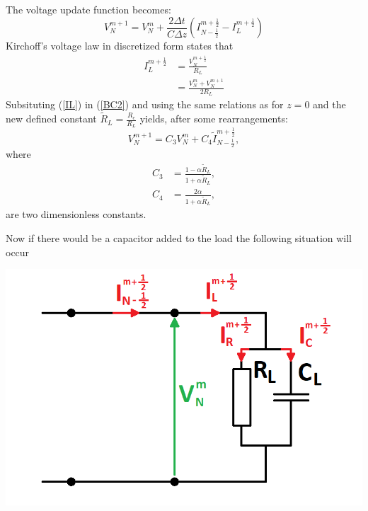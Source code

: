 \documentclass[dutch, a4paper, 11pt]{article}
\begin{document}
\begin{multicols}{2}
\begin{itemize}
    The voltage update function becomes:
    \begin{equation}
        V^{m+1}_{N} = V^{m}_{N} + \frac{2\Delta t}{C\Delta z}\left(I^{m+\frac{1}{2}}_{N-\frac{1}{2}} - I^{m+\frac{1}{2}}_{L}\right)
        \label{BC2}
    \end{equation}
    Kirchoff's voltage law in discretized form states that
    \begin{align}
        I^{m+\frac{1}{2}}_{L} & = \frac{V^{m+\frac{1}{2}}_{N}}{R_{L}}\\
        & = \frac{V^{m}_{N}+V^{m+1}_{N}}{2R_{L}}
        \label{IL}
    \end{align}
    Subsituting (\ref{IL}) in (\ref{BC2}) and using the same relations as for $z=0$ and the new defined constant $\tilde{R}_{L} = \frac{R_c}{R_L}$ yields, 
    after some rearrangements:
    \begin{equation}
        V^{m+1}_{N} = C_{3}V^{m}_N + C_{4}\tilde{I}^{m+\frac{1}{2}}_{N-\frac{1}{2}},
    \end{equation}
    where
    \begin{align}
        C_{3} & = \frac{1-\alpha\tilde{R}_{L}}{1+\alpha\tilde{R}_{L}},\\
        C_{4} & = \frac{2\alpha}{1+\alpha\tilde{R}_{L}},
    \end{align}
    are two dimensionless constants.

    Now if there would be a capacitor added to the load the following situation will occur
    
    \begin{center}
    \includegraphics[scale=0.35]{BC2_cap}
    \end{center}
    

\end{itemize}
\end{multicols}
\end{document}
